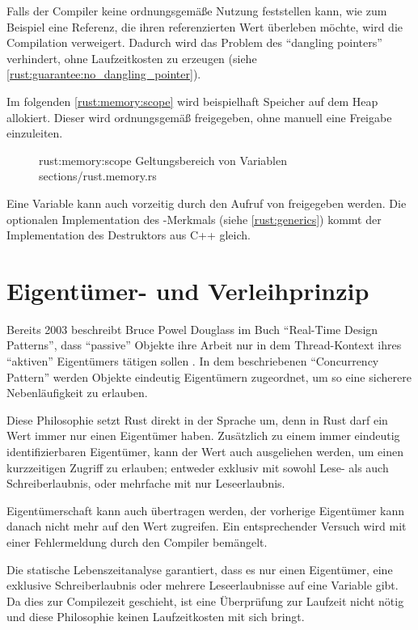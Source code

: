 Falls der Compiler keine ordnungsgemäße Nutzung feststellen kann, wie zum Beispiel eine Referenz, die ihren referenzierten Wert überleben möchte, wird die Compilation verweigert.
Dadurch wird das Problem des \enquote{dangling pointers} verhindert, ohne Laufzeitkosten zu erzeugen (siehe \autoref{rust:guarantee:no_dangling_pointer}).

Im folgenden \autoref{rust:memory:scope} wird beispielhaft Speicher auf dem Heap allokiert.
Dieser wird ordnungsgemäß freigegeben, ohne manuell eine Freigabe einzuleiten.

\begin{figure}[H]
	\rustcinclude
		{rust:memory:scope}
		{Geltungsbereich von Variablen}
		{sections/rust.memory.rs}
\end{figure}

Eine Variable kann auch vorzeitig durch den Aufruf von  freigegeben werden.
Die optionalen Implementation des -Merkmals (siehe \autoref{rust:generics}) kommt der Implementation des Destruktors aus C++ gleich.

\section{Eigentümer- und Verleihprinzip}
\label{rust:ownership}

Bereits 2003 beschreibt Bruce Powel Douglass im Buch \enquote{Real-Time Design Patterns}, dass \enquote{passive} Objekte ihre Arbeit nur in dem Thread-Kontext ihres \enquote{aktiven} Eigentümers tätigen sollen \cite[204]{douglass2003real}.
In dem beschriebenen \enquote{Concurrency Pattern} werden Objekte eindeutig Eigentümern zugeordnet, um so eine sicherere Nebenläufigkeit zu erlauben.

Diese Philosophie setzt Rust direkt in der Sprache um, denn in Rust darf ein Wert immer nur einen Eigentümer haben.
Zusätzlich zu einem immer eindeutig identifizierbaren Eigentümer, kann der Wert auch ausgeliehen werden, um einen kurzzeitigen Zugriff zu erlauben; entweder exklusiv mit sowohl Lese- als auch Schreiberlaubnis, oder mehrfache mit nur Leseerlaubnis.

Eigentümerschaft kann auch übertragen werden, der vorherige Eigentümer kann danach nicht mehr auf den Wert zugreifen.
Ein entsprechender Versuch wird mit einer Fehlermeldung durch den Compiler bemängelt.

Die statische Lebenszeitanalyse garantiert, dass es nur einen Eigentümer, eine exklusive Schreiberlaubnis oder mehrere Leseerlaubnisse auf eine Variable gibt.
Da dies zur Compilezeit geschieht, ist eine Überprüfung zur Laufzeit nicht nötig und diese Philosophie keinen Laufzeitkosten mit sich bringt.

